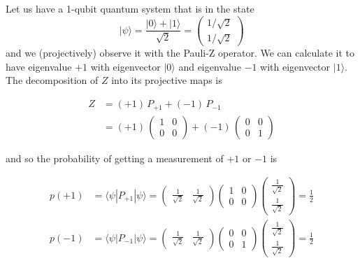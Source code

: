 \documentclass{article}
\begin{document}
      \begin{example}
        Let us have a 1-qubit quantum system that is in the state
        \[|\psi \rangle = \frac{|0\rangle + |1 \rangle}{\sqrt{2}} = \begin{pmatrix} 1/\sqrt{2} \\ 1/\sqrt{2} \end{pmatrix}\]
        and we (projectively) observe it with the Pauli-Z operator. We can calculate it to have eigenvalue $+1$ with eigenvector $|0\rangle$ and eigenvalue $-1$ with eigenvector $|1\rangle$. The decomposition of $Z$ into its projective maps is

        \begin{align*}
          Z & = (+1) \, P_{+1} + (-1)\, P_{-1} \\
          & = (+1) \, \begin{pmatrix} 1&0\\0&0 \end{pmatrix} + (-1)\, \begin{pmatrix} 0&0\\0&1 \end{pmatrix}
        \end{align*}

        and so the probability of getting a measurement of $+1$ or $-1$ is

        \begin{align*}
          p(+1) & = \langle \psi | P_{+1} | \psi \rangle = \begin{pmatrix} \frac{1}{\sqrt{2}} & \frac{1}{\sqrt{2}} \end{pmatrix} \begin{pmatrix} 1&0\\0&0 \end{pmatrix} \begin{pmatrix} \frac{1}{\sqrt{2}} \\ \frac{1}{\sqrt{2}} \end{pmatrix} = \frac{1}{2} \\
          p(-1) & = \langle \psi | P_{-1} | \psi \rangle = \begin{pmatrix} \frac{1}{\sqrt{2}} & \frac{1}{\sqrt{2}} \end{pmatrix} \begin{pmatrix} 0&0\\0&1 \end{pmatrix} \begin{pmatrix} \frac{1}{\sqrt{2}} \\ \frac{1}{\sqrt{2}} \end{pmatrix} = \frac{1}{2}
        \end{align*}
      \end{example}
\end{document}
